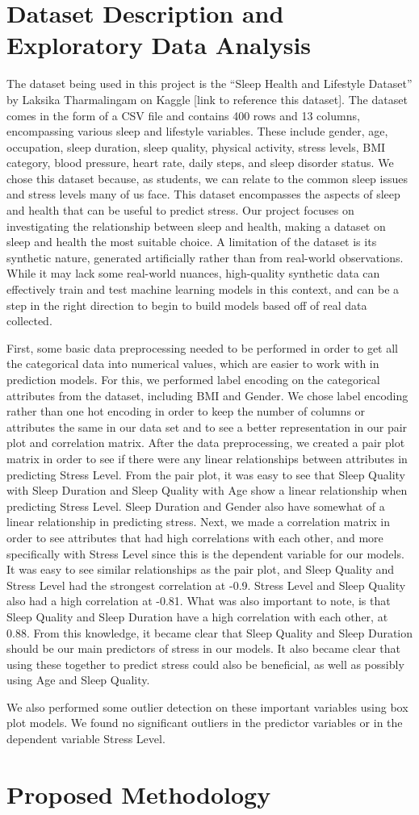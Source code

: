 \documentclass[11pt, letterpaper]{article}
\begin{document}
    \section*{Dataset Description and Exploratory Data Analysis}
    The dataset being used in this project is the “Sleep Health and Lifestyle Dataset” by Laksika Tharmalingam on Kaggle [link to reference this dataset]. The dataset comes in the form of a CSV file and contains 400 rows and 13 columns, encompassing various sleep and lifestyle variables. These include gender, age, occupation, sleep duration, sleep quality, physical activity, stress levels, BMI category, blood pressure, heart rate, daily steps, and sleep disorder status. We chose this dataset because, as students, we can relate to the common sleep issues and stress levels many of us face. This dataset encompasses the aspects of sleep and health that can be useful to predict stress. Our project focuses on investigating the relationship between sleep and health, making a dataset on sleep and health the most suitable choice. A limitation of the dataset is its synthetic nature, generated artificially rather than from real-world observations. While it may lack some real-world nuances, high-quality synthetic data can effectively train and test machine learning models in this context, and can be a step in the right direction to begin to build models based off of real data collected.

    First, some basic data preprocessing needed to be performed in order to get all the categorical data into numerical values, which are easier to work with in prediction models. For this, we performed label encoding on the categorical attributes from the dataset, including BMI and Gender. We chose label encoding rather than one hot encoding in order to keep the number of columns or attributes the same in our data set and to see a better representation in our pair plot and correlation matrix. After the data preprocessing, we created a pair plot matrix in order to see if there were any linear relationships between attributes in predicting Stress Level. From the pair plot, it was easy to see that Sleep Quality with Sleep Duration and Sleep Quality with Age show a linear relationship when predicting Stress Level. Sleep Duration and Gender also have somewhat of a linear relationship in predicting stress. Next, we made a correlation matrix in order to see attributes that had high correlations with each other, and more specifically with Stress Level since this is the dependent variable for our models. It was easy to see similar relationships as the pair plot, and Sleep Quality and Stress Level had the strongest correlation at -0.9. Stress Level and Sleep Quality also had a high correlation at -0.81. What was also important to note, is that Sleep Quality and Sleep Duration have a high correlation with each other, at 0.88. From this knowledge, it became clear that Sleep Quality and Sleep Duration should be our main predictors of stress in our models. It also became clear that using these together to predict stress could also be beneficial, as well as possibly using Age and Sleep Quality.
     
    We also performed some outlier detection on these important variables using box plot models. We found no significant outliers in the predictor variables or in the dependent variable Stress Level.


    \section*{Proposed Methodology}
    
\end{document}
